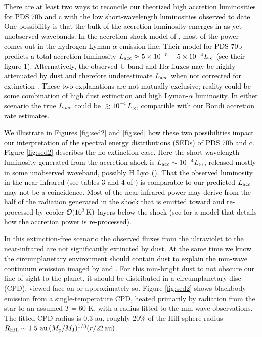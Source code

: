\documentclass[fleqn,usenatbib]{mnras}
\newcommand{\nick}[1]{\textcolor{black}{ #1}}
\begin{document}
\nick{There are at least two ways to reconcile our theorized high accretion luminosities for PDS 70b and c with the low short-wavelength luminosities observed to date. One possibility is that the bulk of the accretion luminosity emerges in as yet unobserved wavebands. In the accretion shock model of \cite{aoyama_etal_2021}, most of the power comes out in the hydrogen Lyman-$\alpha$ emission line. Their model for PDS 70b predicts a total accretion luminosity $L_{\rm acc} \approx 5\times 10^{-5} - 5\times 10^{-4} L_\odot$ (see their figure 1). Alternatively, the observed U-band and H$\alpha$ fluxes may be highly attenuated by dust and therefore underestimate $L_{\rm acc}$ when not corrected for extinction \citep{hashimoto_etal_2020}. 
These two explanations are not mutually exclusive; reality could be some combination of high dust extinction and high Lyman-$\alpha$ luminosity.
In either scenario the true $L_{\rm acc}$ could be $\gtrsim 10^{-4}\,L_\odot$, compatible with our Bondi accretion rate estimates.}

\nick{We illustrate in Figures \ref{fig:sed2} and \ref{fig:sed} how these two possibilities impact our interpretation of the spectral energy distributions (SEDs) of PDS 70b and c. Figure \ref{fig:sed2} describes the no-extinction case. Here the short-wavelength luminosity generated from the accretion shock is $L_{\rm acc} \sim 10^{-4}L_\odot$, released mostly in some unobserved waveband, possibly H Ly$\alpha$ (\citealt{aoyama_etal_2021}). That the observed luminosity in the near-infrared (see tables 3 and 4 of \citealt{wang_etal_2020}) is comparable to our predicted $L_{\rm acc}$ may not be a coincidence. Most of the near-infrared power may derive from the half of the radiation generated in the shock that is emitted toward and re-processed by cooler $\mathcal{O}(10^3\,\rm K)$ layers below the shock (see \citealt{aoyama_etal_2020} for a model that details how the accretion power is re-processed).}

In this extinction-free scenario the observed fluxes from the ultraviolet to the near-infrared are not significantly extincted by dust. \nick{At the same time we know the circumplanetary environment should contain dust to explain the mm-wave continuum emission imaged by 
\cite{isella_etal_2019} and \citet[][]{benisty_etal_2021}.} For this mm-bright dust to not obscure our line of sight to the planet, it should be distributed in a circumplanetary disc (CPD), viewed face on or approximately so. Figure \ref{fig:sed2} shows blackbody emission from a single-temperature CPD, heated primarily by radiation from the star to an assumed $T = 60$ K, with a radius fitted to the mm-wave observations. The fitted CPD radius is 0.3 au, roughly 20\% of the Hill sphere radius $R_{\rm Hill} \sim  1.5\,\,\mathrm{au} \,(M_{\rm p}/M_{\rm J})^{1/3}(r/22\,\rm au)$.
\end{document}
